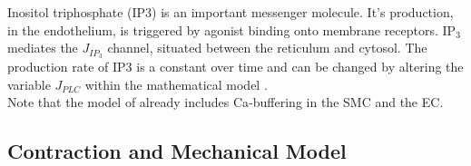 Inositol triphosphate (\gls{IP3}) is an important messenger molecule. It's production, in the endothelium, is triggered by agonist binding onto membrane receptors. IP$_3$ mediates the $ J_{IP_3} $ channel, situated between the reticulum and cytosol. 
The production rate of IP3 is a constant over time and can be changed by altering the variable  $ J_{PLC}$ within the mathematical model .\\
Note that the model of \citet{Koenigsberger2006} already includes \gls{Ca}-buffering in the SMC and the EC.











\subsection{Contraction and Mechanical Model}


